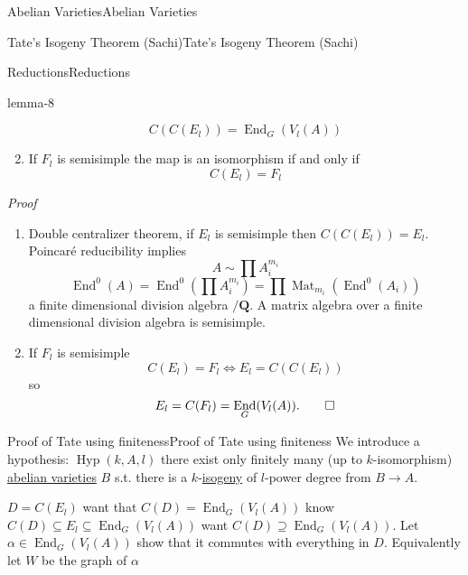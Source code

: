 \documentclass[10pt,]{book}
\makeatletter
\renewcommand*{\proofname}{Proof}
\renewenvironment{proof}[1][\proofname]{\par
  \pushQED{\qed}%
  \normalfont \topsep6\p@\@plus6\p@\relax
  \trivlist
  \item\relax
    {\itshape
    #1\@addpunct{.}}\hspace\labelsep\ignorespaces
}{%
  \popQED\endtrivlist\@endpefalse
}
\numberwithin{equation}{section}
\newcommand{\QQ}{\mathbf{Q}}
\DeclareMathOperator{\End}{End}
\DeclareMathOperator{\Mat}{Mat}
\makeatother
\begin{document}
\begin{chapterptx}{Abelian Varieties}{}{Abelian Varieties}{}{}
\begin{sectionptx}{Tate's Isogeny Theorem (Sachi)}{}{Tate's Isogeny Theorem (Sachi)}{}{}
\begin{subsectionptx}{Reductions}{}{Reductions}{}{}
\begin{lemma}{}{}{lemma-8}
\begin{enumerate}
\begin{equation*}
C(C(E_l)) = \End_G(V_l(A))
\end{equation*}
%
\item\hypertarget{li-78}{}If \(F_l\) is semisimple the map is an isomorphism if and only if%
\begin{equation*}
C(E_l) = F_l
\end{equation*}
%
\end{enumerate}
%
\end{lemma}
\begin{proof}\hypertarget{proof-66}{}
\hypertarget{p-390}{}%
\leavevmode%
\begin{enumerate}
\item\hypertarget{li-79}{}Double centralizer theorem, if \(E_l\) is semisimple then \(C(C(E_l))= E_l\). Poincaré reducibility implies%
\begin{equation*}
A\sim \prod A_i^{m_i}
\end{equation*}
%
\begin{equation*}
\End^0(A) = \End^0(\prod A_i^{m_i}) = \prod \Mat_{m_i}(\End^0(A_i))
\end{equation*}
a finite dimensional division algebra \(/\QQ\). A matrix algebra over a finite dimensional division algebra is semisimple.%
\item\hypertarget{li-80}{}If \(F_l\) is semisimple%
\begin{equation*}
C(E_l) = F_l \iff E_l = C(C(E_l))
\end{equation*}
so%
\begin{equation*}
E_l = C(F_l) = \End_G(V_l(A))\text{.}\qedhere
\end{equation*}
%
\end{enumerate}
%
\end{proof}
\end{subsectionptx}
%
%
\typeout{************************************************}
\typeout{************************************************}
%
\begin{subsectionptx}{Proof of Tate using finiteness}{}{Proof of Tate using finiteness}{}{}\label{subsection-35}
\hypertarget{p-391}{}%
We introduce a hypothesis: \(\operatorname{Hyp}(k,A,l)\) there exist only finitely many (up to \(k\)-isomorphism) \hyperref[def-buntes-abvar]{abelian varieties} \(B\) s.t. there is a \(k\)-\hyperref[def-supersing-isog-isog]{isogeny} of \(l\)-power degree from \(B\to A\).%
\par
\hypertarget{p-392}{}%
\(D =C(E_l)\) want that \(C(D) = \End_G(V_l(A))\) know \(C(D) \subseteq E_l \subseteq \End_G(V_l(A))\) want \(C(D) \supseteq \End_G(V_l(A))\). Let \(\alpha \in \End_G(V_l(A))\) show that it commutes with everything in \(D\). Equivalently let \(W\) be the graph of \(\alpha\)%

\end{subsectionptx}
\end{sectionptx}
\end{chapterptx}
\end{document}
